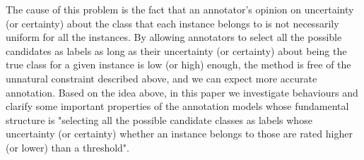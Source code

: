 \documentclass[a4paper,conference]{IEEEtran}
\begin{document}
The cause of this problem is the fact that an annotator's opinion on uncertainty (or certainty) about the class that each instance belongs to is not necessarily uniform for all the instances.
By allowing annotators to select all the possible candidates as labels as long as their uncertainty (or certainty) about being the true class for a given instance is low (or high) enough, the method is free of the unnatural constraint described above, and we can expect more accurate annotation.
Based on the idea above, in this paper we investigate behaviours and clarify some important properties of the annotation models whose fundamental structure is "selecting all the possible candidate classes as labels whose uncertainty (or certainty) whether an instance belongs to those are rated higher (or lower) than a threshold".
\end{document}
